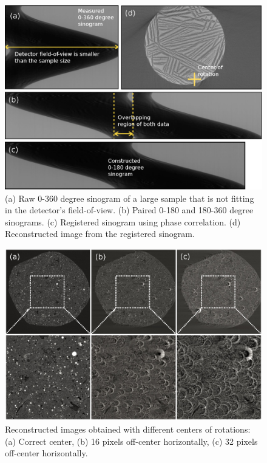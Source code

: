 \documentclass[pdf]{iucr}              %
\begin{document}
\begin{figure}
\centering
\includegraphics[width=\textwidth]{figs/fov_correction.eps}
\caption{(a) Raw 0-360 degree sinogram of a large sample that is not fitting in the detector's field-of-view. (b) Paired 0-180 and 180-360 degree sinograms. (c) Registered sinogram using phase correlation. (d) Reconstructed image from the registered sinogram.}
\label{fov_correction}
\end{figure}

\begin{figure}
\centering
\includegraphics[width=\textwidth]{figs/center_optimize.eps}
\caption{Reconstructed images obtained with different centers of rotations: (a) Correct center, (b) 16 pixels  off-center horizontally, (c) 32 pixels off-center horizontally.}
\label{OptimizeCenter1}
\end{figure}
\end{document}

